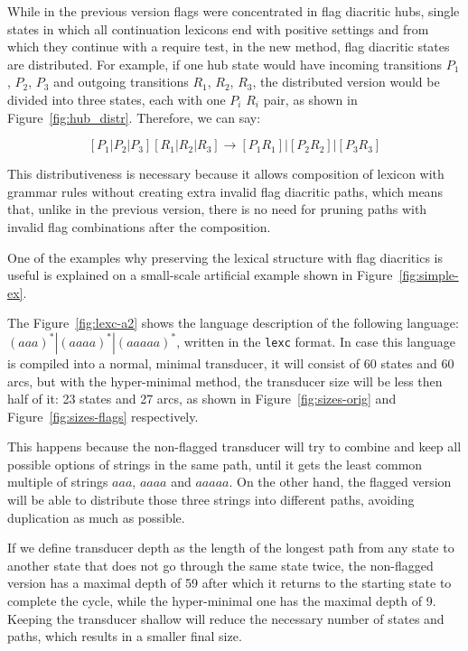 \documentclass[11pt]{article}
\begin{document}
While in the previous version flags were concentrated in flag diacritic hubs, single states in which all continuation lexicons end with positive settings and from which they continue with a require test, in the new method, flag diacritic states are distributed. For example, if one hub state would have incoming transitions 
$P_1$, $P_2$, $P_3$ and outgoing transitions $R_1$, $R_2$, $R_3$, the distributed version would be divided into three states, each with one 
$P_i$ $R_i$ pair, as shown in 
Figure~\ref{fig:hub_distr}. Therefore, we can say:

\begin{equation}\label{hub_replacement}
[P_1 | P_2 | P_3] [R_1 | R_2 | R_3] \rightarrow [P_1 R_1] | [P_2 R_2] | [P_3 R_3]
\end{equation}



This distributiveness is necessary because it allows 
composition of lexicon with grammar rules without creating extra invalid flag diacritic paths, which means that, 
unlike in the previous version, there is no need for pruning paths with invalid flag combinations after the composition.


One of the examples why preserving the lexical structure with flag diacritics is useful is explained on a small-scale artificial example shown in 
Figure~\ref{fig:simple-ex}.
 
The Figure~\ref{fig:lexc-a2} shows the language description of the following language: $(aaa)^*|(aaaa)^*|(aaaaa)^*$, written in 
the \texttt{lexc} format. In case this language is compiled into a normal, minimal transducer, it will consist of 60 states and 60 arcs, 
but with the hyper-minimal method, the transducer size will be less then half of it: 23 states and 27 arcs, as shown in 
Figure~\ref{fig:sizes-orig} and Figure~\ref{fig:sizes-flags} respectively.

This happens because the non-flagged transducer will try to combine and keep all possible options of strings in the same path, until it gets 
the least common multiple of strings $aaa$, $aaaa$ and $aaaaa$. On the other hand, the flagged version will be able to distribute those three 
strings into different paths, avoiding duplication as much as possible.

If we define transducer depth as the length of the longest path from any state to another state that does not go through the same state twice, 
the non-flagged version has a maximal depth of 59 after which it returns to the starting state to complete the cycle, while the hyper-minimal 
one has the maximal depth of 9. Keeping the transducer shallow will reduce the necessary number of states and paths, which results in a smaller final size.
\end{document}
